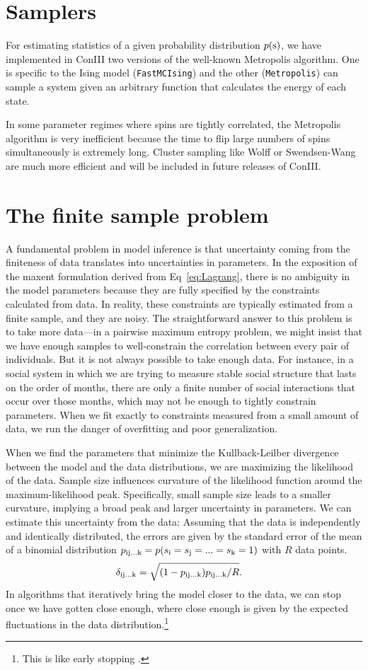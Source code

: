 \documentclass[aps,prl,twocolumn,nofootinbib]{revtex4-1}
\begin{document}
\section{Samplers}
For estimating statistics of a given probability distribution $p({\rm s})$, we have implemented in ConIII two versions of the well-known Metropolis algorithm. One is specific to the Ising model ({\tt FastMCIsing}) and the other ({\tt Metropolis}) can sample a system given an arbitrary function that calculates the energy of each state.

In some parameter regimes where spins are tightly correlated, the Metropolis algorithm is very inefficient because the time to flip large numbers of spins simultaneously is extremely long. Cluster sampling like Wolff or Swendsen-Wang are much more efficient and will be included in future releases of ConIII.

\section{The finite sample problem}
A fundamental problem in model inference is that uncertainty coming
from the finiteness of data translates into uncertainties in parameters.
In the exposition of the maxent formulation derived from Eq~\ref{eq:Lagrang}, there is no ambiguity in the model parameters because they are fully specified by the constraints calculated from data. In reality, these constraints are typically estimated from a finite sample, and they are noisy.
The straightforward answer to this problem is to take more data---in a pairwise
maximum entropy problem, we might insist that we have enough samples to well-constrain
the correlation between every pair of individuals.  But it is not always possible
to take enough data.  For instance, in a social system in which we are trying to
measure stable social structure that lasts on the order of months, there are only
a finite number of social interactions that occur over those months, which may
not be enough to tightly constrain parameters. When we fit exactly to constraints measured from a small amount of data, we run the danger of overfitting and poor generalization.

When we find the parameters that minimize the Kullback-Leilber divergence between the model and the data distributions, we are maximizing the likelihood of the data. 
Sample size influences curvature of the likelihood function around the maximum-likelihood peak.  Specifically, small sample size leads to a smaller curvature, implying a broad peak and larger uncertainty in parameters.
We can estimate this uncertainty from the data: Assuming that the data is independently and identically distributed, the errors are given by the standard error of the mean of a binomial distribution \mbox{$p_{\rm ij...k} = p(s_{\rm i}=s_{\rm j}=...=s_{\rm k}=1)$} with $R$ data points.
\begin{align}
	\delta_{\rm ij...k} &= \sqrt{(1-p_{\rm ij...k})p_{\rm ij...k}/R}.
\end{align}
In algorithms that iteratively bring the model closer to the data, we can stop once we have gotten close enough, where close enough is given by the expected fluctuations in the data distribution.\footnote{This is like early stopping \cite{}.}
\end{document}
